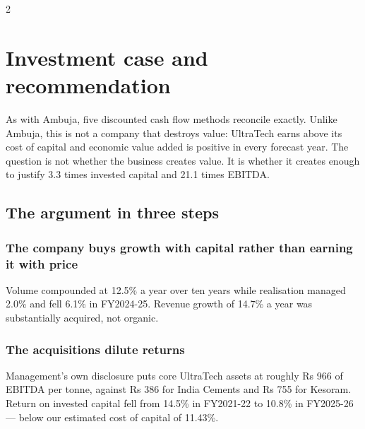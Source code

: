 


\begin{paracol}{2}
\section{Investment case and recommendation}

 As with Ambuja, five
discounted cash flow methods reconcile exactly. Unlike Ambuja, this is not a company
that destroys value: UltraTech earns above its cost of capital and economic value
added is positive in every forecast year. The question is not whether the business
creates value. It is whether it creates enough to justify 3.3 times invested capital
and 21.1 times EBITDA.

\subsection{The argument in three steps}

\subsubsection{The company buys growth with capital rather than earning it with
price} Volume compounded at 12.5\% a year over ten years while realisation managed
2.0\% and fell 6.1\% in FY2024-25. Revenue growth of 14.7\% a year was substantially
acquired, not organic.

\subsubsection{The acquisitions dilute returns} Management's own disclosure puts core
UltraTech assets at roughly Rs 966 of EBITDA per tonne, against Rs 386 for India
Cements and Rs 755 for Kesoram. Return on invested capital fell from 14.5\% in
FY2021-22 to 10.8\% in FY2025-26 — below our estimated cost of capital of 11.43\%.


\end{paracol}
